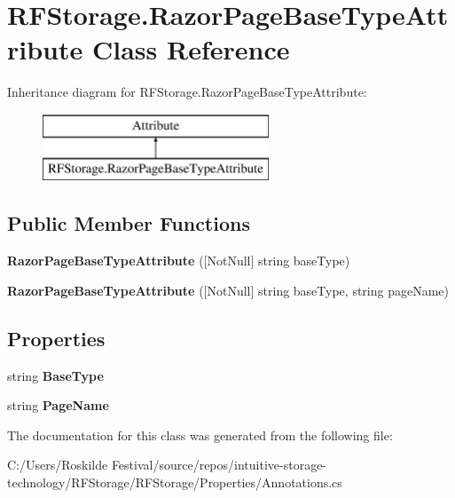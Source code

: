 \hypertarget{class_r_f_storage_1_1_razor_page_base_type_attribute}{}\section{R\+F\+Storage.\+Razor\+Page\+Base\+Type\+Attribute Class Reference}
\label{class_r_f_storage_1_1_razor_page_base_type_attribute}
Inheritance diagram for R\+F\+Storage.\+Razor\+Page\+Base\+Type\+Attribute\+:\begin{figure}[H]
\begin{center}
\leavevmode
\includegraphics[height=2.000000cm]{class_r_f_storage_1_1_razor_page_base_type_attribute}
\end{center}
\end{figure}
\subsection*{Public Member Functions}
\begin{DoxyCompactItemize}
\item 
\mbox{\label{class_r_f_storage_1_1_razor_page_base_type_attribute_a4608fbff6aae9fab5ab74d945ca509f8}} 
{\bfseries Razor\+Page\+Base\+Type\+Attribute} (\mbox{[}Not\+Null\mbox{]} string base\+Type)
\item 
\mbox{\label{class_r_f_storage_1_1_razor_page_base_type_attribute_a80e5efec9aeba16468d6c11e63e53a3d}} 
{\bfseries Razor\+Page\+Base\+Type\+Attribute} (\mbox{[}Not\+Null\mbox{]} string base\+Type, string page\+Name)
\end{DoxyCompactItemize}
\subsection*{Properties}
\begin{DoxyCompactItemize}
\item 
\mbox{\label{class_r_f_storage_1_1_razor_page_base_type_attribute_ae130b555450df41c4ce772053bf135a6}} 
string {\bfseries Base\+Type}
\item 
\mbox{\label{class_r_f_storage_1_1_razor_page_base_type_attribute_a18185441cfd8f33adec138b2958a84bc}} 
string {\bfseries Page\+Name}
\end{DoxyCompactItemize}


The documentation for this class was generated from the following file\+:\begin{DoxyCompactItemize}
\item 
C\+:/\+Users/\+Roskilde Festival/source/repos/intuitive-\/storage-\/technology/\+R\+F\+Storage/\+R\+F\+Storage/\+Properties/Annotations.\+cs\end{DoxyCompactItemize}
